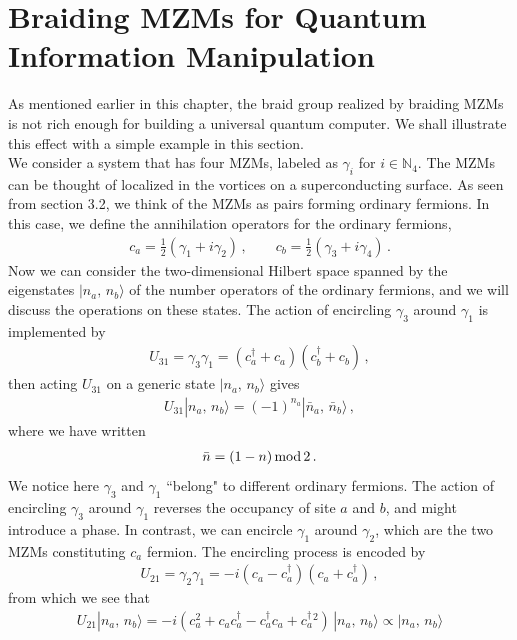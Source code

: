 \documentclass[11pt, oneside]{book}
\theoremstyle{break}
\theoremstyle{break}
\newcommand{\N}{\mathbb{N}}
\begin{document}
\section{Braiding MZMs for Quantum Information Manipulation}
As mentioned earlier in this chapter, the braid group realized by braiding MZMs is not rich enough for building a universal quantum computer. We shall illustrate this effect with a simple example in this section. \\

We consider a system that has four MZMs, labeled as $\gamma_i$ for $i\in \N_4$. The MZMs can be thought of localized in the vortices on a superconducting surface. As seen from section 3.2, we think of the MZMs as pairs forming ordinary fermions. In this case, we define the annihilation operators for the ordinary fermions,
\begin{align}
c_a = \frac{1}{2}\left(\gamma_1 + i\gamma_2\right)\,,\qquad
c_b = \frac{1}{2}\left(\gamma_3 + i\gamma_4\right)\,.
\end{align} 
Now we can consider the two-dimensional Hilbert space spanned by the eigenstates $|n_a,\, n_b\rangle$ of the number operators of the ordinary fermions, and we will discuss the operations on these states. The action of encircling $\gamma_3$ around $\gamma_1$ is implemented by 
\begin{align}
U_{31} = \gamma_3 \gamma_1 = \left( c_a^\dagger + c_a\right) \left(c_b^\dagger+ c_b\right)\,,
\end{align}
then acting $U_{31}$ on a generic state $|n_a,\, n_b\rangle$ gives
\begin{align}
U_{31}|n_a,\,n_b\rangle = (-1)^{n_a} |\bar{n}_a, \, \bar{n}_b\rangle\,,
\end{align}
where we have written
\begin{align}
\bar{n} = (1-n)\text{\,mod\,} 2\,.
\end{align}
We notice here $\gamma_3$ and $\gamma_1$ ``belong" to different ordinary fermions. The action of encircling $\gamma_3$ around $\gamma_1$ reverses the occupancy of site $a$ and $b$, and might introduce a phase. In contrast, we can encircle $\gamma_1$ around $\gamma_2$, which are the two MZMs constituting $c_a$ fermion. The encircling process is encoded by 
\begin{align}
U_{21} = \gamma_2 \gamma_1 =-i \left(c_a -c_a^\dagger \right) \left(c_a+c_a^\dagger\right)\,,
\end{align}
from which we see that 
\begin{align}
U_{21}|n_a,\, n_b\rangle = -i\left(c_a^2 + c_ac_a^\dagger - c_a^\dagger c_a + c_a^\dagger{}^2\right)\, |n_a,\, n_b\rangle \propto |n_a,\, n_b\rangle
\end{align}
\end{document}
